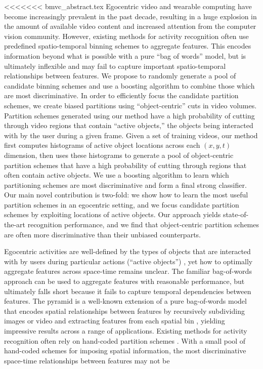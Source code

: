 \documentclass[extendedabs]{bmvc2k}
\begin{document}
<<<<<<< bmvc_abstract.tex
	Egocentric video and wearable computing have become increasingly
	prevalent in the past decade, resulting in a huge explosion in the amount
	of available video content and increased attention from the computer
  vision community.
  However, existing methods for activity recognition often use
  predefined spatio-temporal binning schemes
  to aggregate features. This encodes information beyond what is possible
  with a pure ``bag of words'' model, but is ultimately inflexible
  and may fail to capture important spatio-temporal relationships between
  features.
  We propose to randomly generate a pool of candidate binning schemes and
  use a boosting algorithm to combine those which are most discriminative. 
  In order to efficiently focus the candidate partition schemes, we
  create biased partitions using ``object-centric'' cuts in video volumes.
  Partition schemes generated using our method have a high probability of
  cutting through video regions that contain ``active objects,'' the objects
  being interacted with by the user during a given frame.
  Given a set of training videos, our method first computes histograms of
  active object locations across each $(x, y, t)$ dimension, then uses these
  histograms to generate a pool of object-centric partition schemes that
  have a high probability of cutting through regions that often contain
  active objects.
	We use a boosting algorithm to learn which partitioning schemes are
  most discriminative and form a
	final strong classifier. Our main novel contribution is two-fold: we show how to learn the
  most useful partition schemes in an egocentric setting, and we focus
  candidate partition schemes by exploiting locations of active objects.
  Our approach yields state-of-the-art recognition performance, and we find
  that object-centric partition schemes are often more discriminative than
  their unbiased counterparts.

 Egocentric activities
  are well-defined by the types of objects that are interacted with by users
  during particular actions (``active objects'') \cite{Ramanan12}, yet how to optimally aggregate
  features across space-time remains unclear.
  The familiar bag-of-words approach can be used to aggregate 
  features with reasonable performance, but ultimately falls short because it
  fails to capture temporal dependencies between features.
  The pyramid is a well-known extension of a pure bag-of-words model that encodes spatial
  relationships between features by recursively subdividing images or video and extracting 
  features from each spatial bin \cite{Lazebnik06}, yielding impressive
  results across a range of applications.
  Existing methods for activity recognition often rely on
  hand-coded partition schemes \cite{Ramanan12, Choi08, Laptev08}.
  With a small pool of hand-coded schemes for imposing spatial
  information, the most discriminative space-time relationships between features may not be 
\end{document}
